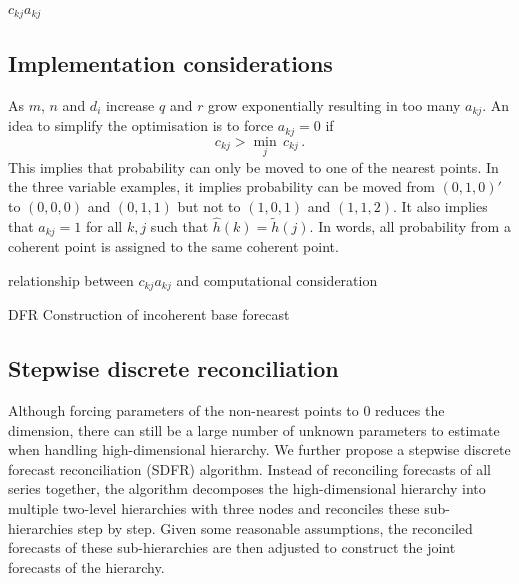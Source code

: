 \documentclass[a4paper,review,12pt,authoryear]{elsarticle}
\begin{document}
    {\color{red} $c_{kj}a_{kj}$}

    

    \subsection{Implementation considerations}
    
    As $m$, $n$ and $d_i$ increase $q$ and $r$ grow exponentially resulting in too many $a_{kj}$. An idea to simplify the optimisation is to force $a_{kj}=0$ if 
    \[
      c_{kj}>\underset{j}{\min}\,c_{kj}\,.
    \]  
    This implies that probability can only be moved to one of the nearest points. In the three variable examples, it implies probability can be moved from $(0,1,0)'$ to $(0,0,0)$ and $(0,1,1)$ but not to $(1,0,1)$ and $(1,1,2)$. It also implies that $a_{kj}=1$ for all $k,j$ such that $\hat{h}(k)=\tilde{h}(j)$. In words, all probability from a coherent point is assigned to the same coherent point.

    {\color{red} relationship between  $c_{kj}a_{kj}$ and computational consideration}

    {\color{red} DFR}
    {\color{red} Construction of incoherent base forecast}

    \subsection{Stepwise discrete reconciliation}
    \label{sec:algorithm2}

    Although forcing parameters of the non-nearest points to 0 reduces the dimension, there can still be a large number of unknown parameters to estimate when handling high-dimensional hierarchy.
    We further propose a stepwise discrete forecast reconciliation (SDFR) algorithm.
    Instead of reconciling forecasts of all series together,  the algorithm
    decomposes the high-dimensional hierarchy into multiple two-level hierarchies with three nodes and reconciles these sub-hierarchies step by step.
    Given some reasonable assumptions, the reconciled forecasts of these sub-hierarchies are then adjusted to construct the joint forecasts of the hierarchy.
\end{document}
